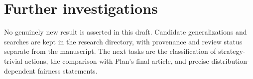 \section{Further investigations}
No genuinely new result is asserted in this draft. Candidate generalizations
and searches are kept in the research directory, with provenance and review
status separate from the manuscript. The next tasks are the classification
of strategy-trivial actions, the comparison with Plan's final article, and
precise distribution-dependent fairness statements.
